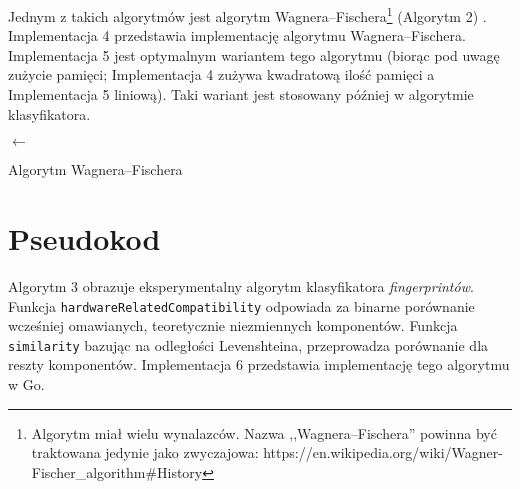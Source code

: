 Jednym z takich algorytmów jest algorytm Wagnera--Fischera\footnote{Algorytm
	miał wielu wynalazców. Nazwa ,,Wagnera--Fischera'' powinna być traktowana
	jedynie jako zwyczajowa:
	https://en.wikipedia.org/wiki/Wagner-Fischer\_algorithm\#History} (Algorytm 2)
\cite{wagner1974string}. Implementacja 4 przedstawia implementację algorytmu
Wagnera--Fischera. Implementacja 5 jest optymalnym wariantem tego algorytmu
(biorąc pod uwagę zużycie pamięci; Implementacja 4 zużywa kwadratową ilość
pamięci a Implementacja 5 liniową). Taki wariant jest stosowany później w
algorytmie klasyfikatora.

\begin{algorithm}
	\SetAlgoVlined
	\BlankLine
	\BlankLine
	\VarD $\leftarrow$ \VarE{$0 \dots$ \VarM, $0 \dots$ \VarN}\;
	\Return{\VarD{\VarM, \VarN}}\;
	\caption{Algorytm Wagnera--Fischera}
\end{algorithm}





\section{Pseudokod}
Algorytm 3 obrazuje eksperymentalny algorytm klasyfikatora \emph{fingerprintów}.
Funkcja \texttt{hardwareRelatedCompatibility} odpowiada za binarne porównanie
wcześniej omawianych, teoretycznie niezmiennych komponentów. Funkcja
\texttt{similarity} bazując na odległości Levenshteina, przeprowadza porównanie
dla reszty komponentów. Implementacja 6 przedstawia implementację tego algorytmu
w Go.

